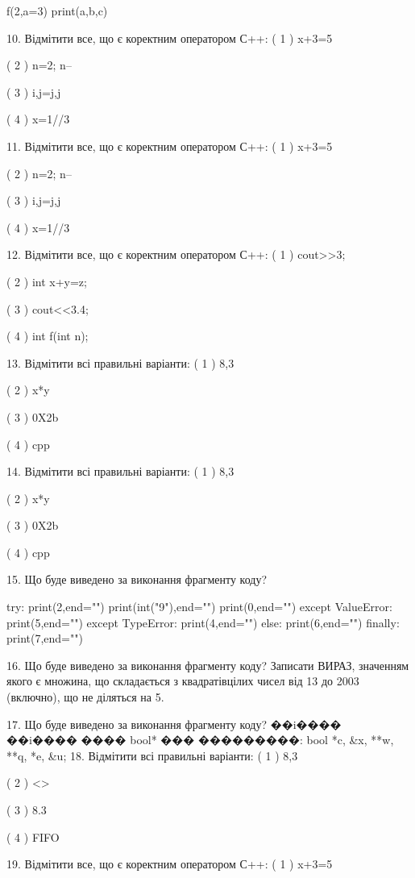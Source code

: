 \documentclass[11pt]{article}
\begin{document}
f(2,a=3)
print(a,b,c)


10. Відмітити все, що є коректним оператором С++:
( 1 ) x+3=5

( 2 ) n=2; n--

( 3 ) i,j=j,j

( 4 ) x=1//3

11. Відмітити все, що є коректним оператором С++:
( 1 ) x+3=5

( 2 ) n=2; n--

( 3 ) i,j=j,j

( 4 ) x=1//3

12. Відмітити все, що є коректним оператором С++:
( 1 ) cout>>3;

( 2 ) int x+y=z;

( 3 ) cout<<3.4;

( 4 ) int f(int n);

13. Відмітити всі правильні варіанти:
( 1 ) 8,3

( 2 ) x*y

( 3 ) 0X2b

( 4 ) cpp

14. Відмітити всі правильні варіанти:
( 1 ) 8,3

( 2 ) x*y

( 3 ) 0X2b

( 4 ) cpp

15. Що буде виведено за виконання фрагменту коду?

try:
    print(2,end="")
    print(int("9"),end="")
    print(0,end="")
except ValueError: print(5,end="")
except TypeError: print(4,end="")
else: print(6,end="")
finally: print(7,end="")


16. Що буде виведено за виконання фрагменту коду?
Записати ВИРАЗ, значенням якого є множина, що складається з квадратівцілих чисел від 13 до 2003 (включно), що не діляться на 5.

17. Що буде виведено за виконання фрагменту коду?
��i���� ��i���� ���� bool* ��� ���������: bool *c, &x, **w, **q, *e, &u;
18. Відмітити всі правильні варіанти:
( 1 ) 8,3

( 2 ) <>

( 3 ) 8.3

( 4 ) FIFO

19. Відмітити все, що є коректним оператором С++:
( 1 ) x+3=5
\end{document}
